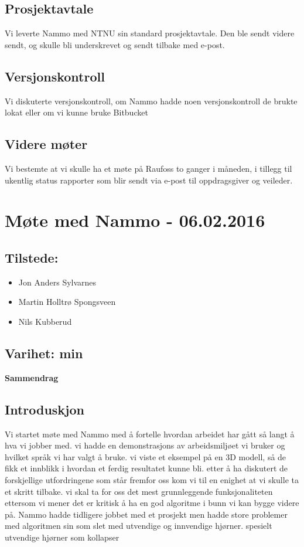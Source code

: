 \subsection*{Prosjektavtale}
Vi leverte Nammo med NTNU sin standard prosjektavtale. Den ble sendt videre sendt, og skulle bli underskrevet og sendt tilbake med e-post.

\subsection*{Versjonskontroll}
Vi diskuterte versjonskontroll, om Nammo hadde noen versjonskontroll de brukte lokat eller om vi kunne bruke Bitbucket

\subsection*{Videre møter}
Vi bestemte at vi skulle ha et møte på Raufoss to ganger i måneden, i tillegg til ukentlig status rapporter som blir sendt via e-post til oppdragsgiver og veileder.


\pagebreak

\section{Møte med Nammo - 06.02.2016}

\subsection*{Tilstede:}
\begin{multicols}{2}
\begin{itemize}
    \item Jon Anders Sylvarnes
    \item Martin Holltrø Spongsveen
    \item Nils Kubberud
\end{itemize}{}
\end{multicols}
\subsection*{\large Varihet:  min}
\textbf{\Large Sammendrag}

\subsection*{Introduskjon}

Vi startet møte med Nammo med å fortelle hvordan arbeidet har gått så langt å hva vi jobber med. vi hadde en demonstrasjons av arbeidsmiljøet vi bruker og hvilket språk vi har valgt å bruke. vi viste et eksempel på en 3D modell, så de fikk et innblikk i hvordan et ferdig resultatet kunne bli. etter å ha diskutert de forskjellige utfordringene som står fremfor oss kom vi til en enighet at vi skulle ta et skritt tilbake. vi skal ta for oss det mest grunnleggende funksjonaliteten ettersom vi mener det er kritisk å ha en god algoritme i bunn vi kan bygge videre på. Nammo hadde tidligere jobbet med et prosjekt men hadde store problemer med algoritmen sin som slet med utvendige og innvendige hjørner. spesielt utvendige hjørner som kollapser 